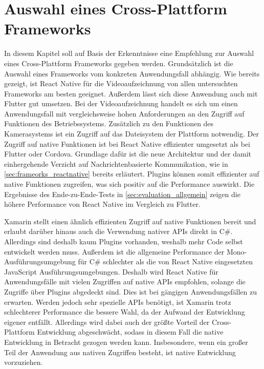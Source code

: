 \chapter{Auswahl eines Cross-Plattform Frameworks}
\label{ch:auswahl}

In diesem Kapitel soll auf Basis der Erkenntnisse eine Empfehlung zur Auswahl eines Cross-Plattform Frameworks gegeben werden.
Grundsätzlich ist die Auswahl eines Frameworks vom konkreten Anwendungsfall abhängig.
Wie bereits gezeigt, ist React Native für die Videoaufzeichnung von allen untersuchten Frameworks am besten geeignet.
Außerdem lässt sich diese Anwendung auch mit Flutter gut umsetzen.
Bei der Videoaufzeichnung handelt es sich um einen Anwendungsfall mit vergleichsweise hohen Anforderungen an den Zugriff auf Funktionen des Betriebssystems.
Zusätzlich zu den Funktionen des Kamerasystems ist ein Zugriff auf das Dateisystem der Plattform notwendig.
Der Zugriff auf native Funktionen ist bei React Native effizienter umgesetzt als bei Flutter oder Cordova.
Grundlage dafür ist die neue Architektur und der damit einhergehende Verzicht auf Nachrichtenbasierte Kommunikation, wie in \autoref{sec:frameorks_reactnative} bereits erläutert.
Plugins können somit effizienter auf native Funktionen zugreifen, was sich positiv auf die Performance auswirkt.
Die Ergebnisse des Ende-zu-Ende-Tests in \autoref{sec:evaluation_allgemein} zeigen die höhere Performance von React Native im Vergleich zu Flutter.

Xamarin stellt einen ähnlich effizienten Zugriff auf native Funktionen bereit und erlaubt darüber hinaus auch die Verwendung nativer \acp{API} direkt in C\#.
Allerdings sind deshalb kaum Plugins vorhanden, weshalb mehr Code selbst entwickelt werden muss.
Außerdem ist die allgemeine Performance der Mono-Ausführungsumgebung für C\# schlechter als die von React Native eingesetzten JavaScript Ausführungsumgebungen.
Deshalb wird React Native für Anwendungsfälle mit vielen Zugriffen auf native \acp{API} empfohlen, solange die Zugriffe über Plugins abgedeckt sind.
Dies ist bei gängigen Anwendungsfällen zu erwarten.
Werden jedoch sehr spezielle \acp{API} benötigt, ist Xamarin trotz schlechterer Performance die bessere Wahl, da der Aufwand der Entwicklung eigener entfällt.
Allerdings wird dabei auch der größte Vorteil der Cross-Plattform Entwicklung abgeschwächt, sodass in diesem Fall die native Entwicklung in Betracht gezogen werden kann.
Insbesondere, wenn ein großer Teil der Anwendung aus nativen Zugriffen besteht, ist native Entwicklung vorzuziehen.

